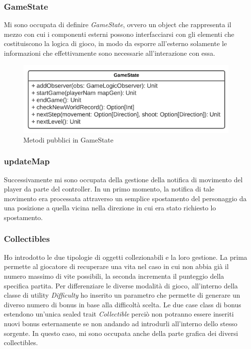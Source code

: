 
\subsubsection{GameState}

Mi sono occupata di definire \textit{GameState}, ovvero un object che rappresenta il mezzo con cui i componenti esterni possono interfacciarsi con gli elementi che costituiscono la logica di gioco, in modo da esporre all'esterno solamente le informazioni che effettivamente sono necessarie all'interazione con essa.
    \begin{figure}[H]\centering
      \includegraphics[width=12cm]{res/GameState-uml.png}
      \caption{Metodi pubblici in GameState}
      \label{gameState}
    \end{figure}


\subsubsection{updateMap}

Successivamente mi sono occupata della gestione della notifica di movimento del player da parte del controller. In un primo momento, la notifica di tale movimento era processata attraverso un semplice spostamento del personaggio da una posizione a quella vicina nella direzione in cui era stato richiesto lo spostamento.


\subsubsection{Collectibles}

Ho introdotto le due tipologie di oggetti collezionabili e la loro gestione. La prima permette al giocatore di recuperare una vita nel caso in cui non abbia già il numero massimo di vite possibili, la seconda incrementa il punteggio della specifica partita.
Per differenziare le diverse modalità di gioco, all'interno della classe di utility \textit{Difficulty} ho inserito un parametro che permette di generare un diverso numero di bonus in base alla difficoltà scelta.
Le due case class di bonus estendono un'unica sealed trait \textit{Collectible} perciò non potranno essere inseriti nuovi bonus esternamente se non andando ad introdurli all'interno dello stesso sorgente.
In questo caso, mi sono occupata anche della parte grafica dei diversi collectibles. 

